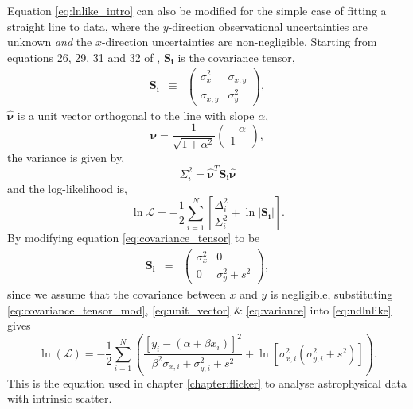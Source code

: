 Equation \ref{eq:lnlike_intro} can also be modified for the simple case of
fitting a straight line to data, where the $y$-direction observational
uncertainties are unknown {\it and} the $x$-direction uncertainties are
non-negligible.
Starting from equations 26, 29, 31 and 32 of \citet{Hogg2010b},
$\mathbf{S_i}$ is the covariance tensor,
\begin{eqnarray}
    \mathbf{S_i} &\equiv& \left( \begin{array}{cc}
                    \sigma_{x}^2 & \sigma_{x,y} \\
                    \sigma_{x,y} & \sigma_{y}^2
\end{array}\right),
\end{eqnarray}
\label{eq:covariance_tensor}
$\mathbf{\hat{\nu}}$ is a unit vector orthogonal to the line with slope
$\alpha$,
\begin{equation}
    \mathbf{\hat{\nu}} = \frac{1}{\sqrt{1 + \alpha^2}} \left( \begin{array}{c}
                                                    -\alpha \\
                                                    1
    \end{array}\right),
\end{equation}
\label{eq:unit_vector}
the variance is given by,
\begin{equation}
    \Sigma_i^2 = \mathbf{\hat{\nu}}^T \mathbf{S_i} \mathbf{\hat{\nu}}
\end{equation}
\label{eq:variance}
and the log-likelihood is,
\begin{equation}
    \ln\mathcal{L} = - \frac{1}{2} \sum_{i=1}^N \left[
    \frac{\Delta_i^2}{\Sigma_i^2} + \ln|\mathbf{S_i}| \right].
\end{equation}
\label{eq:ndlnlike}
By modifying equation \ref{eq:covariance_tensor} to be
\begin{eqnarray}
    \mathbf{S_i} &=& \left( \begin{array}{cc}
                    \sigma_{x}^2 & 0 \\
                    0 & \sigma_{y}^2 + s^2
\end{array}\right),
\end{eqnarray}
\label{eq:covariance_tensor_mod}
since we assume that the covariance between $x$ and $y$ is negligible,
substituting \ref{eq:covariance_tensor_mod}, \ref{eq:unit_vector} \&
\ref{eq:variance} into \ref{eq:ndlnlike} gives
\begin{equation}
    \ln(\mathcal{L}) = -\frac{1}{2} \sum_{i=1}^N
    \left( \frac{\left[ y_i - (\alpha + \beta x_i) \right]^2}
    {\beta^2\sigma_{x, i} + \sigma_{y, i}^2 + s^2} + \ln[\sigma_{x,
    i}^2(\sigma_{y, i}^2 + s^2)]
    \right).
\end{equation}
This is the equation used in chapter \ref{chapter:flicker} to analyse
astrophysical data with intrinsic scatter.


